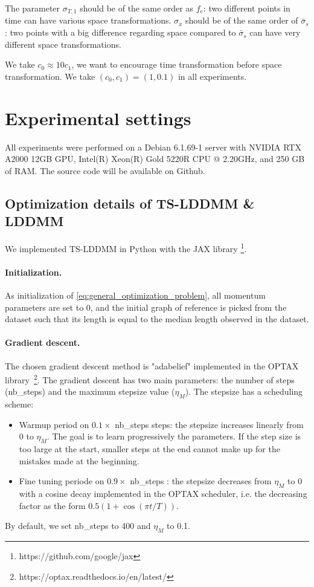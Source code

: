 The parameter $\sigma_{T,1}$ should be of the same order as $f_e$: two different points in time can have various space transformations.
 $\sigma_x$ should be of the same order of $\bar{\sigma}_s$: two points with a big difference regarding space compared to $\bar{\sigma}_s$ can have very different space transformations.

 We take $c_0\approx 10 c_1 $, we want to encourage time transformation before space transformation. We take $(c_0,c_1)=(1,0.1)$ in all experiments.


\section{Experimental settings}
\label{appendix:settings}
All experiments were performed on a Debian 6.1.69-1 server with NVIDIA RTX A2000 12GB GPU, Intel(R) Xeon(R) Gold 5220R CPU @ 2.20GHz, and 250 GB of RAM. The source code will be available on Github.

\subsection{Optimization details of TS-LDDMM \& LDDMM}
\label{appendix:optimizers_details}

We implemented TS-LDDMM in Python with the JAX library \footnote{https://github.com/google/jax}.

\paragraph{Initialization.}
As initialization of \eqref{eq:general_optimization_problem}, all momentum parameters are set to $0$, and the initial graph of reference is picked from the dataset such that its length is equal to the median length observed in the dataset.

\paragraph{Gradient descent.}
The chosen gradient descent method is "adabelief" \cite{zhuang2020adabelief} implemented in the OPTAX library~\footnote{https://optax.readthedocs.io/en/latest/}.
The gradient descent has two main parameters: the number of steps (nb\_steps) and the maximum stepsize value ($\eta_M$).
The stepsize has a scheduling scheme: 
\begin{itemize}
  \item Warmup period on $0.1 \times$ nb\_steps steps: the stepsize increases linearly from $0$ to $\eta_M$. The goal is to learn progressively the parameters. If the step size is too large at the start, smaller steps at the end cannot make up for the mistakes made at the beginning. 
  \item Fine tuning periode on $ 0.9  \times$ nb\_steps : the stepsize decreases from $\eta_M$ to $0$ with a cosine decay implemented in the OPTAX scheduler, i.e. the decreasing factor as the form $0.5  (1 + \cos(\pi  t/T))$. 
\end{itemize}
By default, we set nb\_steps to 400 and $\eta_M$ to 0.1.

